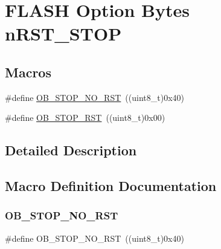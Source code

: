 \hypertarget{group___f_l_a_s_h_ex___option___bytes__n_r_s_t___s_t_o_p}{}\section{F\+L\+A\+SH Option Bytes n\+R\+S\+T\+\_\+\+S\+T\+OP}
\label{group___f_l_a_s_h_ex___option___bytes__n_r_s_t___s_t_o_p}
\subsection*{Macros}
\begin{DoxyCompactItemize}
\item 
\#define \mbox{\hyperlink{group___f_l_a_s_h_ex___option___bytes__n_r_s_t___s_t_o_p_ga7344fe0ec25c5eb2d11db7c855325436}{O\+B\+\_\+\+S\+T\+O\+P\+\_\+\+N\+O\+\_\+\+R\+ST}}~((uint8\+\_\+t)0x40)
\item 
\#define \mbox{\hyperlink{group___f_l_a_s_h_ex___option___bytes__n_r_s_t___s_t_o_p_gaef92c03b1f279c532bfa13d3bb074b57}{O\+B\+\_\+\+S\+T\+O\+P\+\_\+\+R\+ST}}~((uint8\+\_\+t)0x00)
\end{DoxyCompactItemize}


\subsection{Detailed Description}


\subsection{Macro Definition Documentation}
\mbox{\label{group___f_l_a_s_h_ex___option___bytes__n_r_s_t___s_t_o_p_ga7344fe0ec25c5eb2d11db7c855325436}} 
\subsubsection{\texorpdfstring{O\+B\+\_\+\+S\+T\+O\+P\+\_\+\+N\+O\+\_\+\+R\+ST}{OB\_STOP\_NO\_RST}}
{\footnotesize\ttfamily \#define O\+B\+\_\+\+S\+T\+O\+P\+\_\+\+N\+O\+\_\+\+R\+ST~((uint8\+\_\+t)0x40)}

